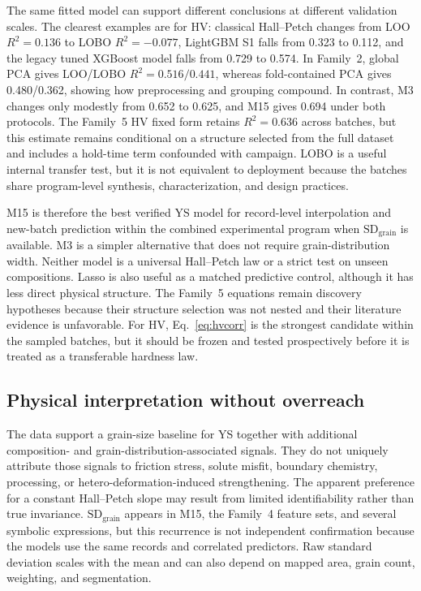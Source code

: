 \documentclass[5p,times,twocolumn]{elsarticle}
\begin{document}
The same fitted model can support different conclusions at different validation scales. The clearest examples are for HV: classical Hall--Petch changes from LOO $R^2=0.136$ to LOBO $R^2=-0.077$, LightGBM S1 falls from 0.323 to 0.112, and the legacy tuned XGBoost model falls from 0.729 to 0.574. In Family~2, global PCA gives LOO/LOBO $R^2=0.516/0.441$, whereas fold-contained PCA gives 0.480/0.362, showing how preprocessing and grouping compound. In contrast, M3 changes only modestly from 0.652 to 0.625, and M15 gives 0.694 under both protocols. The Family~5 HV fixed form retains $R^2=0.636$ across batches, but this estimate remains conditional on a structure selected from the full dataset and includes a hold-time term confounded with campaign. LOBO is a useful internal transfer test, but it is not equivalent to deployment because the batches share program-level synthesis, characterization, and design practices.

M15 is therefore the best verified YS model for record-level interpolation and new-batch prediction within the combined experimental program when $\mathrm{SD}_{\mathrm{grain}}$ is available. M3 is a simpler alternative that does not require grain-distribution width. Neither model is a universal Hall--Petch law or a strict test on unseen compositions. Lasso is also useful as a matched predictive control, although it has less direct physical structure. The Family~5 equations remain discovery hypotheses because their structure selection was not nested and their literature evidence is unfavorable. For HV, Eq.~\eqref{eq:hvcorr} is the strongest candidate within the sampled batches, but it should be frozen and tested prospectively before it is treated as a transferable hardness law.

\subsection{Physical interpretation without overreach}

The data support a grain-size baseline for YS together with additional composition- and grain-distribution-associated signals. They do not uniquely attribute those signals to friction stress, solute misfit, boundary chemistry, processing, or hetero-deformation-induced strengthening. The apparent preference for a constant Hall--Petch slope may result from limited identifiability rather than true invariance. $\mathrm{SD}_{\mathrm{grain}}$ appears in M15, the Family~4 feature sets, and several symbolic expressions, but this recurrence is not independent confirmation because the models use the same records and correlated predictors. Raw standard deviation scales with the mean and can also depend on mapped area, grain count, weighting, and segmentation.
\end{document}

